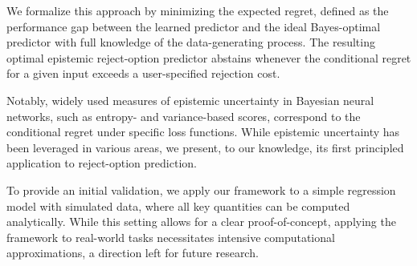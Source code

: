 
We formalize this approach by minimizing the expected regret, defined as the performance gap between the learned predictor and the ideal Bayes-optimal predictor with full knowledge of the data-generating process. The resulting optimal epistemic reject-option predictor abstains whenever the conditional regret for a given input exceeds a user-specified rejection cost.

Notably, widely used measures of epistemic uncertainty in Bayesian neural networks, such as entropy- and variance-based scores, correspond to the conditional regret under specific loss functions. While epistemic uncertainty has been leveraged in various areas, we present, to our knowledge, its first principled application to reject-option prediction.

To provide an initial validation, we apply our framework to a simple regression model with simulated data, where all key quantities can be computed analytically. While this setting allows for a clear proof-of-concept, applying the framework to real-world tasks necessitates intensive computational approximations, a direction left for future research.




